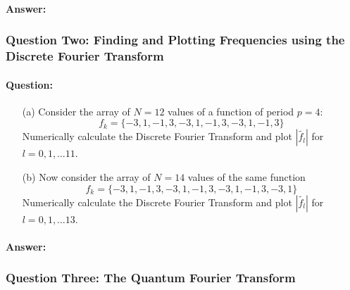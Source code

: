 \documentclass[reprint, amsmath,amssymb, aps]{revtex4-2}
\begin{document}
                \begin{mdframed}
                \paragraph{Answer:}

                
                \end{mdframed}

            \subsubsection{Question Two: Finding and Plotting Frequencies using the Discrete Fourier Transform}
                \paragraph{Question:}
                \begin{itemize}
                    \item[(a)] Consider the array of $N = 12$ values of a function of period $p = 4$:
                    \begin{equation*}
                        f_k = \{-3, 1, -1, 3, -3, 1, -1, 3, -3, 1, -1, 3\}
                    \end{equation*}
                    Numerically calculate the Discrete Fourier Transform and plot $|\tilde{f_l}|$ for $l= 0, 1,\dots 11$.
                    \item[(b)] Now consider the array of $N = 14$ values of the same function
                    \begin{equation*}
                        f_k = \{-3, 1, -1, 3, -3, 1, -1, 3, -3, 1, -1, 3, -3, 1\}
                    \end{equation*}
                    Numerically calculate the Discrete Fourier Transform and plot $|\tilde{f_l}|$ for $l= 0, 1,\dots 13$.
                \end{itemize}

                \begin{mdframed}
                \paragraph{Answer:}

                
                \end{mdframed}

            \subsubsection{Question Three: The Quantum Fourier Transform}
\end{document}
